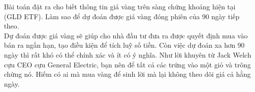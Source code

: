 Bài toán đặt ra cho biết thông tin giá vàng trên sàng chứng khoáng hiện tại (GLD ETF). Làm sao để dự đoán
được giá vàng đóng phiên của 90 ngày tiếp theo. \\
Dự đoán được giá vàng sẽ giúp cho nhà đầu tư đưa ra được quyết định mua vào bán ra ngắn hạn, tạo điều kiện để
tích luỹ số tiền. Còn việc dự đoán xa hơn 90 ngày thì rất khó có thể chính xác và ít có ý nghĩa. Như lời khuyên từ Jack Welch cựu CEO cựu
General Electric, bạn nên để tất cả các trứng vào một giỏ và trông chừng nó. Hiếm có ai mà mua vàng để sinh lời mà lại không theo dõi giá cả hằng ngày.


